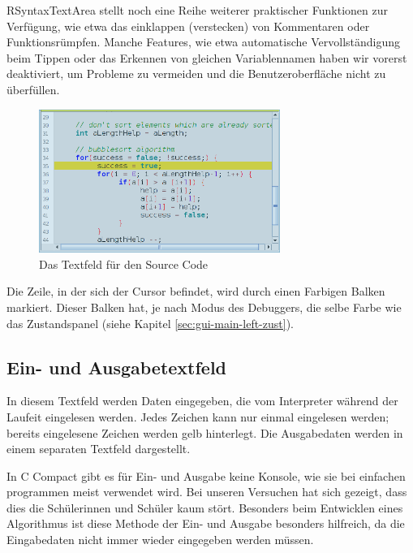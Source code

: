 RSyntaxTextArea stellt noch eine Reihe weiterer praktischer Funktionen zur Verfügung, wie etwa das einklappen (verstecken) von Kommentaren oder Funktionsrümpfen. Manche Features, wie etwa automatische Vervollständigung beim Tippen oder das Erkennen von gleichen Variablennamen haben wir vorerst deaktiviert, um Probleme zu vermeiden und die Benutzeroberfläche nicht zu überfüllen.

\begin{figure}[htbp] 
  \centering
     \includegraphics[width=0.7\textwidth]{./media/images/gui/main/CCompact-gui-left-code.png}
  \caption{Das Textfeld für den Source Code}
  \label{fig:gui-main-left-code}
\end{figure}

Die Zeile, in der sich der Cursor befindet, wird durch einen Farbigen Balken markiert. Dieser Balken hat, je nach Modus des Debuggers, die selbe Farbe wie das Zustandspanel (siehe Kapitel \ref{sec:gui-main-left-zust}).

\subsection{Ein- und Ausgabetextfeld}
\label{sec:gui-main-left-io}

In diesem Textfeld werden Daten eingegeben, die vom Interpreter während der Laufeit eingelesen werden. Jedes Zeichen kann nur einmal eingelesen werden; bereits eingelesene Zeichen werden gelb hinterlegt. Die Ausgabedaten werden in einem separaten Textfeld dargestellt.

In C Compact gibt es für Ein- und Ausgabe keine Konsole, wie sie bei einfachen programmen meist verwendet wird. Bei unseren Versuchen hat sich gezeigt, dass dies die Schülerinnen und Schüler kaum stört. Besonders beim Entwicklen eines Algorithmus ist diese Methode der Ein- und Ausgabe besonders hilfreich, da die Eingabedaten nicht immer wieder eingegeben werden müssen.

